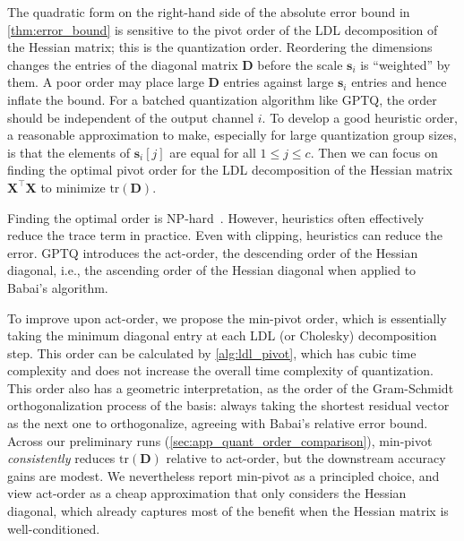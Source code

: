 \documentclass{article} %
\begin{document}
The quadratic form on the right-hand side of the absolute error bound in \cref{thm:error_bound} is sensitive to the pivot order of the LDL decomposition of the Hessian matrix; this is the quantization order.
Reordering the dimensions changes the entries of the diagonal matrix $\bm{D}$ before the scale $\bm{s}_{i}$ is ``weighted'' by them. A poor order may place large $\bm{D}$ entries against large $\bm{s}_{i}$ entries and hence inflate the bound.
For a batched quantization algorithm like GPTQ, the order should be independent of the output channel $i$. To develop a good heuristic order, a reasonable approximation to make, especially for large quantization group sizes, is that the elements of $\bm{s}_{i} [j]$ are equal for all $1 \le j \le c$. Then we can focus on finding the optimal pivot order for the LDL decomposition of the Hessian matrix $\bm{X}^\top \bm{X}$ to minimize $\mathrm{tr} \left( \bm{D} \right)$.

Finding the optimal order is NP-hard~\citep{RoseTarjanLueker1976}. However, heuristics often effectively reduce the trace term in practice.
Even with clipping, heuristics can reduce the error.
GPTQ introduces the act-order, the descending order of the Hessian diagonal, i.e., the ascending order of the Hessian diagonal when applied to Babai's algorithm.

To improve upon act-order, we propose the min-pivot order, which is essentially taking the minimum diagonal entry at each LDL (or Cholesky) decomposition step. This order can be calculated by \cref{alg:ldl_pivot}, which has cubic time complexity and does not increase the overall time complexity of quantization. This order also has a geometric interpretation, as the order of the Gram-Schmidt orthogonalization process of the basis: always taking the shortest residual vector as the next one to orthogonalize, agreeing with Babai's relative error bound. Across our preliminary runs (\cref{sec:app_quant_order_comparison}), min-pivot \emph{consistently} reduces $\mathrm{tr} \left( \bm{D} \right)$ relative to act-order, but the downstream accuracy gains are modest. We nevertheless report min-pivot as a principled choice, and view act-order as a cheap approximation that only considers the Hessian diagonal, which already captures most of the benefit when the Hessian matrix is well-conditioned.
\end{document}
